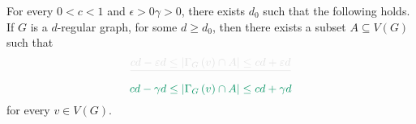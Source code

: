 \documentclass[11pt]{article}
\providecommand{\DIFadd}[1]{\textcolor{shin-ryoku}{#1}}%
\providecommand{\DIFdel}[1]{\textcolor{verylightgray}{\sout{#1}}}                      %
\providecommand{\DIFaddbegin}{} %
\providecommand{\DIFaddend}{} %
\providecommand{\DIFdelbegin}{} %
\providecommand{\DIFdelend}{} %
\begin{document}
\DIFdelend \DIFaddbegin {}
\DIFaddend \begin{lemma} \label{thm:partition}
For every $0 < c < 1$ and \DIFdelbegin \DIFdel{$\epsilon > 0$}\DIFdelend \DIFaddbegin \DIFadd{$\gamma> 0$}\DIFaddend , there exists $d_0$ such that the following holds. If $G$ is a $d$-regular graph, for some $d \ge d_0$, then there exists a subset $A \subseteq V(G)$ such that
\DIFdelbegin \begin{displaymath}
    \DIFdel{cd - \epsilon d \leq \left| \Neighbourhood{G}{v} \cap A \right| \leq cd + \epsilon d 
}\end{displaymath}%
\DIFdelend \DIFaddbegin $$
    \DIFadd{cd - \gamma d \leq \left| \Neighbourhood{G}{v} \cap A \right| \leq cd + \gamma d 
}$$\DIFaddend 
for every $v \in V(G)$.
\end{lemma}
\end{document}
